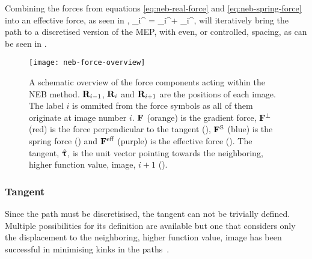 Combining the forces from equations \ref{eq:neb-real-force} and \ref{eq:neb-spring-force} into an effective force, as seen in ,
\vF_i^ = \vF_i^\perp + \vF_i^,
\eeq
will iteratively bring the path to a discretised version of the MEP, with even, or controlled, spacing, as can be seen in .

\begin{figure}[h]
\begin{center}
\texttt{[image: neb-force-overview]}
\parbox{0.85\linewidth}{\caption{A schematic overview of the force components acting within the NEB method.
${\mathrm{\mathbf{\bm{R}}}}_{i-1}$, ${\mathrm{\mathbf{\bm{R}}}}_i$ and ${\mathrm{\mathbf{\bm{R}}}}_{i+1}$ are the positions of each image.
The label $i$ is ommited from the force symbols as all of them originate at image number $i$.
${\mathrm{\mathbf{\bm{F}}}}$ (orange) is the gradient force,
${\mathrm{\mathbf{\bm{F}}}}^\perp$ (red) is the force perpendicular to the tangent (),
${\mathrm{\mathbf{\bm{F}}}}^\text{S}$ (blue) is the spring force () and
${\mathrm{\mathbf{\bm{F}}}}^\text{eff}$ (purple) is the effective force ().
The tangent, $\hat{{\mathrm{\mathbf{\bm{\uptau}}}}}$, is the unit vector pointing towards the neighboring, higher function value, image, $i+1$ ().
}
\label{fig:neb-force-overview}
}
\end{center}
\end{figure}

\subsubsection{Tangent}
Since the path must be discretisised, the tangent can not be trivially defined.
Multiple possibilities for its definition are available but one that considers only the displacement to the neighboring, higher function value, image has been successful in minimising kinks in the paths~\cite{neb-tangent-2000}.

